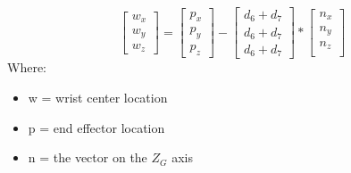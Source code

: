 \documentclass{article}
\begin{document}
\[
\begin{bmatrix}
    w_x \\
    w_y \\
    w_z
\end{bmatrix}
=
\begin{bmatrix}
    p_x \\
    p_y \\
    p_z
\end{bmatrix}
-
\begin{bmatrix}
    d_6 + d_7 \\
    d_6 + d_7 \\
    d_6 + d_7
\end{bmatrix}
*
\begin{bmatrix}
    n_x \\
    n_y \\
    n_z \\
\end{bmatrix}    
\]
Where:
\begin{itemize}
    \item w = wrist center location
    \item p = end effector location
    \item n = the vector on the $Z_G$ axis
\end{itemize}
\end{document}
